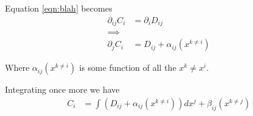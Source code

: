 \documentclass{article}
\begin{document}
Equation \ref{eqn:blah} becomes
\begin{align*}
\partial_{ij} C_i &= \partial_{i} D_{ij}  \\
\implies \\
\partial_{j} C_i &= D_{ij} + \alpha_{ij}(x^{k \ne i})
\end{align*}

Where $\alpha_{ij}(x^{k \ne i})$ is some function of all the $x^k \ne x^i$.

Integrating once more we have
\begin{align*}
C_i &= \int \left(D_{ij} + \alpha_{ij}(x^{k \ne i}) \right) dx^j + \beta_{ij}(x^{k \ne j})
\end{align*}



\end{document}
